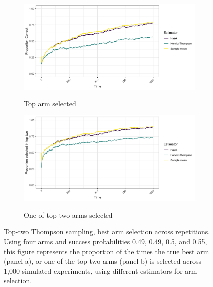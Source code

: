 \documentclass[letterpaper, 12pt, parskip=full,DIV=10]{scrartcl}
\begin{document}
\begin{figure}[htbp]
   \centering
   \begin{subfigure}{\textwidth}
  \centering
  \caption{Top arm selected}
  \includegraphics[width = \textwidth]{../../tables-figures/tt_correct4.png} 
  \label{fig:tt_best1}
\end{subfigure}
\begin{subfigure}{\textwidth}
  \centering
  \caption{One of top two arms selected}
  \includegraphics[width = \textwidth]{../../tables-figures/tt_correct-top-two4.png} 
  \label{fig:tt_best2}
\end{subfigure}
   \caption{Top-two Thompson sampling, best arm selection across repetitions. Using four arms and success probabilities 0.49, 0.49, 0.5, and 0.55, this figure represents the proportion of the times the true best arm (panel a), or one of the top two arms (panel b) is selected across 1,000 simulated experiments, using different estimators for arm selection.}
   \label{fig:ttt_best}
\end{figure}
\end{document}
